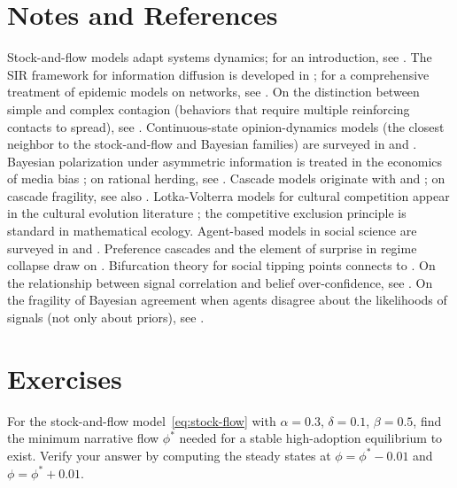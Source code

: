 \section{Notes and References}
\label{sec:ch11-notes}

Stock-and-flow models adapt systems dynamics; for an introduction, see \textcite{sterman2000}.
The SIR framework for information diffusion is developed in \textcite{watts2002}; for a comprehensive treatment of epidemic models on networks, see \textcite{pastor-satorras2015}.
On the distinction between simple and complex contagion (behaviors that require multiple reinforcing contacts to spread), see \textcite{centola2007, centola2018}.
Continuous-state opinion-dynamics models (the closest neighbor to the stock-and-flow and Bayesian families) are surveyed in \textcite{degroot1974} and \textcite{hegselmann2002}.
Bayesian polarization under asymmetric information is treated in the economics of media bias \autocite{gentzkow2010}; on rational herding, see \textcite{banerjee1992}.
Cascade models originate with \textcite{banerjee1992} and \textcite{bikhchandani1992}; on cascade fragility, see also \textcite{chamley2004}.
Lotka-Volterra models for cultural competition appear in the cultural evolution literature \autocite{nowak2006}; the competitive exclusion principle is standard in mathematical ecology.
Agent-based models in social science are surveyed in \textcite{salganik2018} and \textcite{epstein2006}.
Preference cascades and the element of surprise in regime collapse draw on \textcite{kuran1995}.
Bifurcation theory for social tipping points connects to \textcite{schelling1978}.
On the relationship between signal correlation and belief over-confidence, see \textcite{glaeser2009}.
On the fragility of Bayesian agreement when agents disagree about the likelihoods of signals (not only about priors), see \textcite{acemoglu2016}.


\section{Exercises}

\begin{exercise}
For the stock-and-flow model~\eqref{eq:stock-flow} with $\alpha = 0.3$, $\delta = 0.1$, $\beta = 0.5$, find the minimum narrative flow $\phi^*$ needed for a stable high-adoption equilibrium to exist.
Verify your answer by computing the steady states at $\phi = \phi^* - 0.01$ and $\phi = \phi^* + 0.01$.
\end{exercise}

